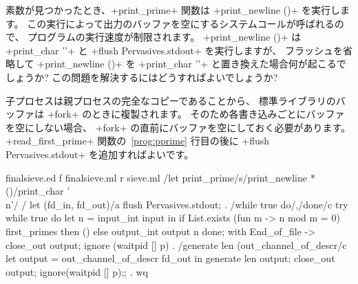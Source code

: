 \begin{exercise}
素数が見つかったとき、\ml+print_prime+ 関数は \ml+print_newline ()+ を実行します。
この実行によって出力のバッファを空にするシステムコールが呼ばれるので、
プログラムの実行速度が制限されます。
\ml+print_newline ()+ は \ml+print_char '\n'+ と \ml+flush Pervasives.stdout+ を実行しますが、
フラッシュを省略して \ml+print_newline ()+ を \ml+print_char '\n'+ と置き換えた場合何が起こるでしょうか?
この問題を解決するにはどうすればよいでしょうか?
\end{exercise}
\begin{answer}
子プロセスは親プロセスの完全なコピーであることから、
標準ライブラリの\io バッファは \ml+fork+ のときに複製されます。
そのため各書き込みごとにバッファを空にしない場合、
\ml+fork+ の直前にバッファを空にしておく必要があります。
\ml+read_first_prime+ 関数の~\ref{prog:pprime} 行目の後に
\ml+flush Pervasives.stdout+ を追加すればよいです。
\end{answer}
%
\begin{codefile}{finalsieve.ed}
f finalsieve.ml
r sieve.ml
/let print_prime/s/print_newline *()/print_char '\\n'/
/    let (fd_in, fd_out)/a
    flush Pervasives.stdout;
.
/while true do/,/done/c
        try
          while true do
            let n = input_int input in
            if List.exists (fun m -> n mod m = 0) first_primes then ()
            else output_int output n
          done;
        with End_of_file ->
          close_out output;
          ignore (waitpid [] p)
.
/generate len (out_channel_of_descr/c
      let output = out_channel_of_descr fd_out in
      generate len output;
      close_out output;
      ignore(waitpid [] p);;
.
wq
\end{codefile}

